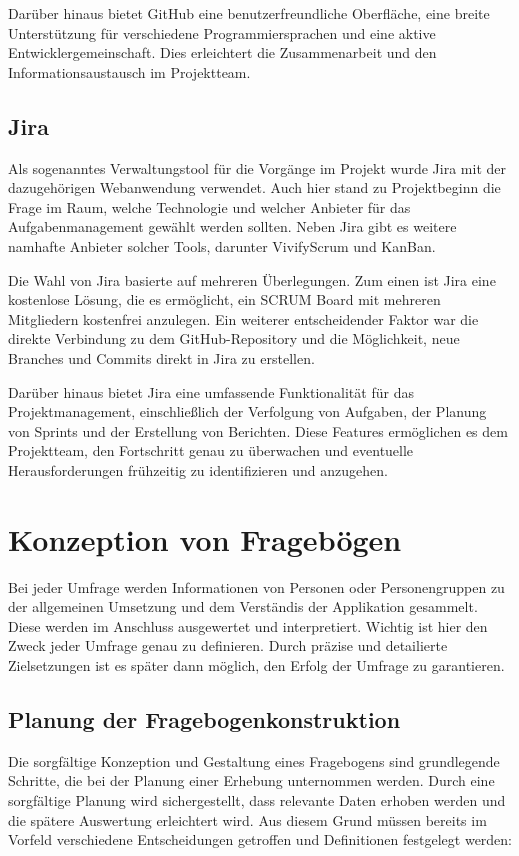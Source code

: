 Darüber hinaus bietet GitHub eine benutzerfreundliche Oberfläche, eine breite Unterstützung
für verschiedene Programmiersprachen und eine aktive Entwicklergemeinschaft. Dies erleichtert
die Zusammenarbeit und den Informationsaustausch im Projektteam.

\subsection{Jira}
Als sogenanntes Verwaltungstool für die Vorgänge im Projekt wurde Jira mit der dazugehörigen
Webanwendung verwendet. Auch hier stand zu Projektbeginn die Frage im Raum, welche Technologie
und welcher Anbieter für das Aufgabenmanagement gewählt werden sollten. Neben Jira gibt es
weitere namhafte Anbieter solcher Tools, darunter VivifyScrum und KanBan.

Die Wahl von Jira basierte auf mehreren Überlegungen. Zum einen ist Jira eine kostenlose
Lösung, die es ermöglicht, ein SCRUM Board mit mehreren Mitgliedern kostenfrei anzulegen.
Ein weiterer entscheidender Faktor war die direkte Verbindung zu dem GitHub-Repository und die Möglichkeit,
neue Branches und Commits direkt in Jira zu erstellen.

Darüber hinaus bietet Jira eine umfassende Funktionalität für das Projektmanagement, einschließlich
der Verfolgung von Aufgaben, der Planung von Sprints und der Erstellung von Berichten. Diese Features
ermöglichen es dem Projektteam, den Fortschritt genau zu überwachen und eventuelle Herausforderungen
frühzeitig zu identifizieren und anzugehen.

\section{Konzeption von Fragebögen}
Bei jeder Umfrage werden Informationen von Personen oder Personengruppen zu der allgemeinen
Umsetzung und dem Verständis der Applikation gesammelt. Diese werden im Anschluss ausgewertet und
interpretiert. Wichtig ist hier den Zweck jeder Umfrage genau zu definieren. Durch präzise und
detailierte Zielsetzungen ist es später dann möglich, den Erfolg der Umfrage zu garantieren.

\subsection{Planung der Fragebogenkonstruktion}

Die sorgfältige Konzeption und Gestaltung eines Fragebogens sind grundlegende Schritte, die bei der Planung einer Erhebung unternommen werden.
Durch eine sorgfältige Planung wird sichergestellt, dass relevante Daten erhoben werden und die spätere Auswertung erleichtert wird.
Aus diesem Grund müssen bereits im Vorfeld verschiedene Entscheidungen getroffen und Definitionen festgelegt werden:

